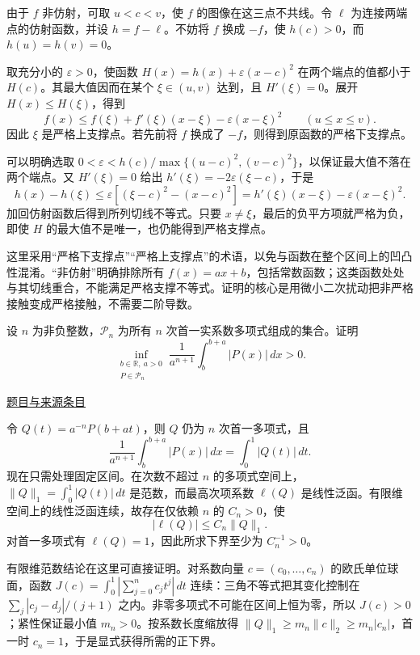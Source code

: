 \documentclass[12pt,fontset=fandol]{ctexart}
\begin{document}
\begin{solve}\label{ans:fin04-all:4}

由于 $f$ 非仿射，可取 $u<c<v$，使 $f$ 的图像在这三点不共线。令 $\ell$ 为连接两端点的仿射函数，并设 $h=f-\ell$。不妨将 $f$ 换成 $-f$，使 $h(c)>0$，而 $h(u)=h(v)=0$。

取充分小的 $\varepsilon>0$，使函数
$H(x)=h(x)+\varepsilon(x-c)^2$ 在两个端点的值都小于 $H(c)$。其最大值因而在某个 $\xi\in(u,v)$ 达到，且 $H'(\xi)=0$。展开 $H(x)\le H(\xi)$，得到
\[
f(x)\le f(\xi)+f'(\xi)(x-\xi)-\varepsilon(x-\xi)^2
\qquad(u\le x\le v).
\]
因此 $\xi$ 是严格上支撑点。若先前将 $f$ 换成了 $-f$，则得到原函数的严格下支撑点。

可以明确选取 $0<\varepsilon<h(c)/\max\{(u-c)^2,(v-c)^2\}$，以保证最大值不落在两个端点。又 $H'(\xi)=0$ 给出 $h'(\xi)=-2\varepsilon(\xi-c)$，于是
\[
h(x)-h(\xi)\le\varepsilon[(\xi-c)^2-(x-c)^2]
=h'(\xi)(x-\xi)-\varepsilon(x-\xi)^2.
\]
加回仿射函数后得到所列切线不等式。只要 $x\ne\xi$，最后的负平方项就严格为负，即使 $H$ 的最大值不是唯一，也仍能得到严格支撑点。

\end{solve}

\begin{remark}[方法与条件]这里采用“严格下支撑点”“严格上支撑点”的术语，以免与函数在整个区间上的凹凸性混淆。“非仿射”明确排除所有 $f(x)=ax+b$，包括常数函数；这类函数处处与其切线重合，不能满足严格支撑不等式。证明的核心是用微小二次扰动把非严格接触变成严格接触，不需要二阶导数。\end{remark}

\begin{example}[来源序号6]\label{ex:fin04-all:6}\label{pr:fin04-all:6}

设 $n$ 为非负整数，$\mathcal P_n$ 为所有 $n$ 次首一实系数多项式组成的集合。证明
\[
\inf_{\substack{b\in\mathbb R,\ a>0\\P\in\mathcal P_n}}
\frac1{a^{n+1}}\int_b^{b+a}|P(x)|\,dx>0.
\]

\par\href{https://github.com/lzxcr/cmc-mathematics/blob/64916fa1fdbc3e444a652eca204d5669058ee321/src/problems/finals/04/06.md}{题目与来源条目}

\end{example}

\begin{solve}\label{ans:fin04-all:6}

令 $Q(t)=a^{-n}P(b+at)$，则 $Q$ 仍为 $n$ 次首一多项式，且
\[
\frac1{a^{n+1}}\int_b^{b+a}|P(x)|\,dx=\int_0^1|Q(t)|\,dt.
\]
现在只需处理固定区间。在次数不超过 $n$ 的多项式空间上，
$\|Q\|_1=\int_0^1|Q(t)|\,dt$ 是范数，而最高次项系数 $\ell(Q)$ 是线性泛函。有限维空间上的线性泛函连续，故存在仅依赖 $n$ 的 $C_n>0$，使
\[
|\ell(Q)|\le C_n\|Q\|_1.
\]
对首一多项式有 $\ell(Q)=1$，因此所求下界至少为 $C_n^{-1}>0$。

有限维范数结论在这里可直接证明。对系数向量 $c=(c_0,\ldots,c_n)$ 的欧氏单位球面，函数 $J(c)=\int_0^1|\sum_{j=0}^nc_jt^j|\,dt$ 连续：三角不等式把其变化控制在 $\sum_j|c_j-d_j|/(j+1)$ 之内。非零多项式不可能在区间上恒为零，所以 $J(c)>0$；紧性保证最小值 $m_n>0$。按系数长度缩放得 $\|Q\|_1\ge m_n\|c\|_2\ge m_n|c_n|$，首一时 $c_n=1$，于是显式获得所需的正下界。

\end{solve}
\end{document}
